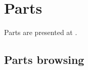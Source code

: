 



\chapter{Parts}\label{Parts}

Parts are presented at .


\section{Parts browsing}\label{Parts browsing}

